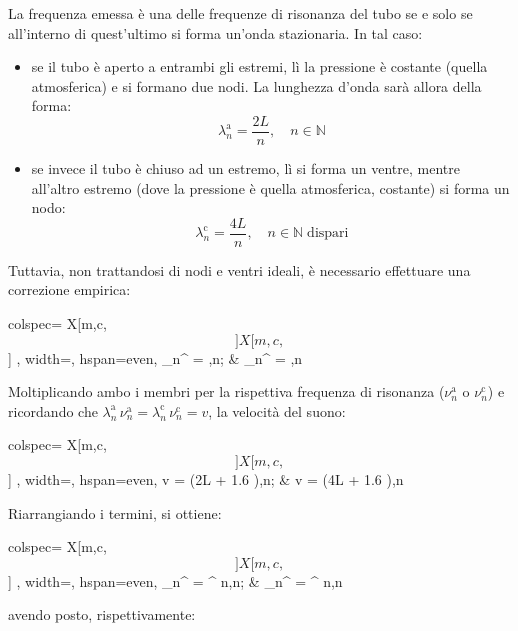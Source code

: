 \documentclass{article}
\newcommand*{\diam}{\varnothing}
\begin{document}
La frequenza emessa è una delle frequenze di risonanza del tubo se e solo se
all'interno di quest'ultimo si forma un'onda stazionaria. In tal caso:
\begin{itemize}
  \item se il tubo è aperto a entrambi gli estremi,
    lì la pressione è costante (quella atmosferica) e si formano due nodi.
    La lunghezza d'onda sarà allora della forma:
    \[ \lambda_n^\text{a} = \frac{2L}{n},\quad n\in\mathbb{N} \]
  \item se invece il tubo è chiuso ad un estremo,
    lì si forma un ventre, mentre all'altro estremo (dove la pressione è
    quella atmosferica, costante) si forma un nodo:
    \[ \lambda_n^\text{c} = \frac{4L}{n},\quad n\in\mathbb{N}\;\text{dispari} \]
\end{itemize}

Tuttavia, non trattandosi di nodi e ventri ideali, è necessario effettuare
una correzione empirica:

\begin{center}\begin{tblr}{
  colspec={ X[m,c,$$]X[m,c,$$] },
  width=\textwidth,
  hspan=even,
}
  \lambda_n^ = \frac{2L + 1.6 \diam}{n},\quad n\in{};
  &
  \lambda_n^ = \frac{4L + 1.6 \diam}{n},\quad n\in{}\;
\end{tblr}\end{center}
Moltiplicando ambo i membri per la rispettiva frequenza di risonanza
($\nu_n^\text{a}$ o $\nu_n^\text{c}$)
e ricordando che $\lambda_n^\text{a}\,\nu_n^\text{a} =
\lambda_n^\text{c}\,\nu_n^\text{c} = v$, la velocità del suono:

\begin{center}\begin{tblr}{
  colspec={ X[m,c,$$]X[m,c,$$] },
  width=\textwidth,
  hspan=even,
}
  v = (2L + 1.6 \diam),\quad n\in{};
  &
  v = (4L + 1.6 \diam),\quad n\in{}\;
\end{tblr}\end{center}

Riarrangiando i termini, si ottiene:

\begin{center}\begin{tblr}{
  colspec={ X[m,c,$$]X[m,c,$$] },
  width=\textwidth,
  hspan=even,
}
  \nu_n^ = \xi^ n,\quad n\in{};
  &
  \nu_n^ = \xi^ n,\quad n\in{}\;
\end{tblr}\end{center}
avendo posto, rispettivamente:
\end{document}
